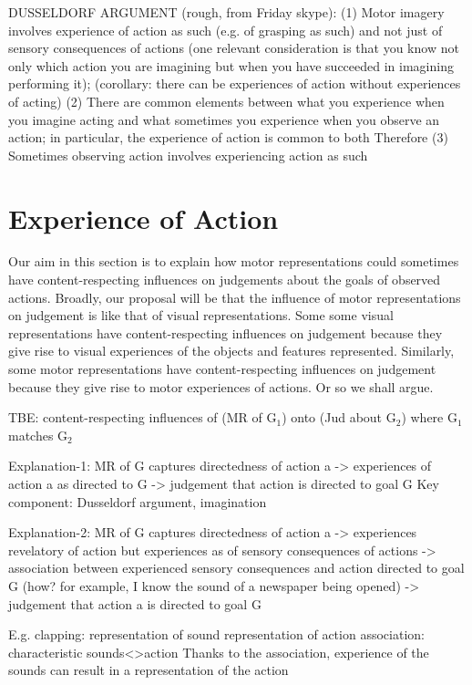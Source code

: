\documentclass[12pt,\papersize]{extarticle}
\begin{document}
DUSSELDORF ARGUMENT (rough, from Friday skype):
(1) Motor imagery involves experience of action as such (e.g. of grasping as such) and not just of sensory consequences of actions
(one relevant consideration is that you know not only which action you are imagining but when you have succeeded in imagining performing it);
(corollary: there can be experiences of action without experiences of acting)
(2) There are common elements between what you  experience when you imagine acting and what sometimes you experience when you observe an action; in particular, the experience of action is common to both
Therefore
(3) Sometimes observing action involves experiencing action as such



\section{Experience of Action}
\label{sec:processes}
Our aim in this section is to explain how motor representations could sometimes have content-respecting influences on judgements about the goals of observed actions.  Broadly, our proposal will be that the influence of motor representations on judgement is like that of visual representations.  Some some visual representations have content-respecting influences on judgement because they give rise to visual experiences of the objects and features represented. Similarly, some motor representations have content-respecting influences on judgement because they give rise to motor experiences of actions.  Or so we shall argue.

TBE: content-respecting influences of (MR of G$_1$) onto (Jud about G$_2$) where G$_1$ matches G$_2$

Explanation-1: MR of G captures directedness of action a -> experiences of action a as directed to G -> judgement that action is directed to goal G
	Key component: Dusseldorf argument, imagination

Explanation-2: MR of G captures directedness of action a -> experiences revelatory of action but experiences as of sensory consequences of actions -> association between experienced sensory consequences and action directed to goal G (how? for example, I know the sound of a newspaper being opened) -> judgement that action a is directed to goal G

E.g. clapping:
	representation of sound
	representation of action
	association: characteristic sounds<>action
	Thanks to the association, experience of the sounds can result in a representation of the action
\end{document}
